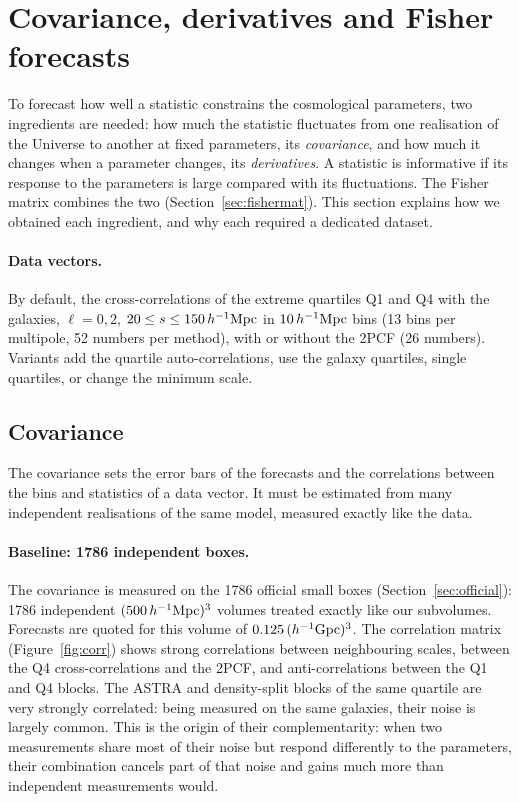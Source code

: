\section{Covariance, derivatives and Fisher forecasts}
\label{sec:framework}

To forecast how well a statistic constrains the cosmological parameters, two ingredients are needed: how much the statistic fluctuates from one realisation of the Universe to another at fixed parameters, its \emph{covariance}, and how much it changes when a parameter changes, its \emph{derivatives}. A statistic is informative if its response to the parameters is large compared with its fluctuations. The Fisher matrix combines the two (Section~\ref{sec:fishermat}). This section explains how we obtained each ingredient, and why each required a dedicated dataset.

\paragraph{Data vectors.} By default, the cross-correlations of the extreme quartiles Q1 and Q4 with the galaxies, $\ell=0,2$, $20\le s\le150\,h^{-1}\mathrm{Mpc}$ in $10\,h^{-1}\mathrm{Mpc}$ bins (13 bins per multipole, 52 numbers per method), with or without the 2PCF (26 numbers). Variants add the quartile auto-correlations, use the galaxy quartiles, single quartiles, or change the minimum scale.

\subsection{Covariance}

The covariance sets the error bars of the forecasts and the correlations between the bins and statistics of a data vector. It must be estimated from many independent realisations of the same model, measured exactly like the data. \paragraph{Baseline: 1786 independent boxes.} The covariance is measured on the 1786 official small boxes (Section~\ref{sec:official}): 1786 independent $(500\,h^{-1}\mathrm{Mpc})^3$ volumes treated exactly like our subvolumes. Forecasts are quoted for this volume of $0.125\,(h^{-1}{\rm Gpc})^3$. The correlation matrix (Figure~\ref{fig:corr}) shows strong correlations between neighbouring scales, between the Q4 cross-correlations and the 2PCF, and anti-correlations between the Q1 and Q4 blocks. The ASTRA and density-split blocks of the same quartile are very strongly correlated: being measured on the same galaxies, their noise is largely common. This is the origin of their complementarity: when two measurements share most of their noise but respond differently to the parameters, their combination cancels part of that noise and gains much more than independent measurements would.

